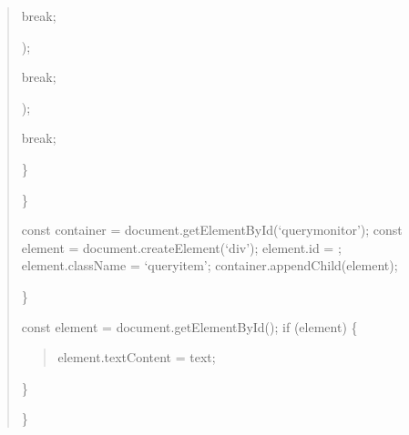 \documentclass[letterpaper,10pt,english]{sphinxmanual}
\begin{document}
\begin{quote}
\begin{description}
\begin{description}
\begin{description}
\sphinxAtStartPar
break;

\begin{description}
\sphinxAtStartPar
{});

\end{description}

\sphinxAtStartPar
break;

\begin{description}
\sphinxAtStartPar
{});

\end{description}

\sphinxAtStartPar
break;

\end{description}

\end{description}

\sphinxAtStartPar
\}

\end{description}

\sphinxAtStartPar
\}
\begin{description}
\sphinxAtStartPar
const container = document.getElementById(‘query\sphinxhyphen{}monitor’);
const element = document.createElement(‘div’);
element.id = ;
element.className = ‘query\sphinxhyphen{}item’;
container.appendChild(element);

\end{description}

\sphinxAtStartPar
\}
\begin{description}
\sphinxAtStartPar
const element = document.getElementById();
if (element) \{
\begin{quote}

\sphinxAtStartPar
element.textContent = text;
\end{quote}

\sphinxAtStartPar
\}

\end{description}

\sphinxAtStartPar
\}
\end{quote}
\end{document}
